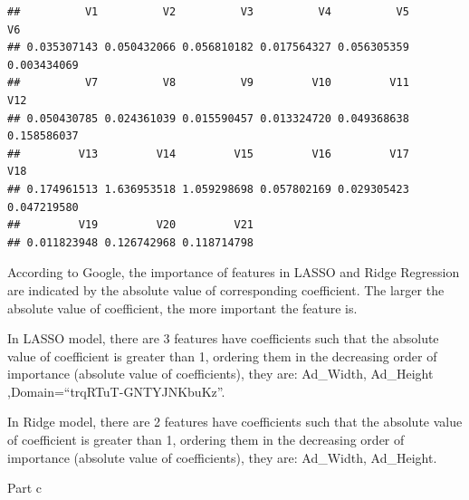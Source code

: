 \documentclass[
]{article}
\newenvironment{Shaded}{\begin{snugshade}}{\end{snugshade}}
\newcommand{\CommentTok}[1]{\textcolor[rgb]{0.56,0.35,0.01}{\textit{#1}}}
\newcommand{\DecValTok}[1]{\textcolor[rgb]{0.00,0.00,0.81}{#1}}
\newcommand{\FunctionTok}[1]{\textcolor[rgb]{0.00,0.00,0.00}{#1}}
\newcommand{\NormalTok}[1]{#1}
\newcommand{\OtherTok}[1]{\textcolor[rgb]{0.56,0.35,0.01}{#1}}
\newcommand{\SpecialCharTok}[1]{\textcolor[rgb]{0.00,0.00,0.00}{#1}}
\begin{document}
\begin{Shaded}
\end{Shaded}

\begin{verbatim}
##          V1          V2          V3          V4          V5          V6 
## 0.035307143 0.050432066 0.056810182 0.017564327 0.056305359 0.003434069 
##          V7          V8          V9         V10         V11         V12 
## 0.050430785 0.024361039 0.015590457 0.013324720 0.049368638 0.158586037 
##         V13         V14         V15         V16         V17         V18 
## 0.174961513 1.636953518 1.059298698 0.057802169 0.029305423 0.047219580 
##         V19         V20         V21 
## 0.011823948 0.126742968 0.118714798
\end{verbatim}

According to Google, the importance of features in LASSO and Ridge
Regression are indicated by the absolute value of corresponding
coefficient. The larger the absolute value of coefficient, the more
important the feature is.

In LASSO model, there are 3 features have coefficients such that the
absolute value of coefficient is greater than 1, ordering them in the
decreasing order of importance (absolute value of coefficients), they
are: Ad\_Width, Ad\_Height ,Domain=``trqRTuT-GNTYJNKbuKz''.

In Ridge model, there are 2 features have coefficients such that the
absolute value of coefficient is greater than 1, ordering them in the
decreasing order of importance (absolute value of coefficients), they
are: Ad\_Width, Ad\_Height.

Part c
\end{document}
